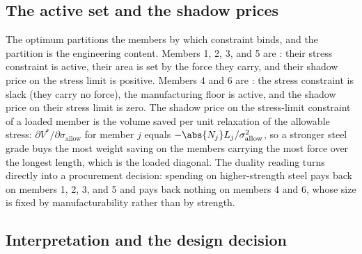 \subsection{The active set and the shadow prices}

The optimum partitions the members by which constraint binds, and
the partition is the engineering content. Members 1, 2, 3, and 5
are : their stress constraint is active,
their area is set by the force they carry, and their shadow price
on the stress limit is positive. Members 4 and 6 are
: the stress constraint is slack (they carry
no force), the manufacturing floor is active, and the shadow price
on their stress limit is zero. The shadow price on the
stress-limit constraint of a loaded member is the volume saved per
unit relaxation of the allowable stress: $\partial V^{*} /
\partial \sigma_{\mathrm{allow}}$ for member $j$ equals
$-\abs{N_{j}} L_{j} / \sigma_{\mathrm{allow}}^{2}$, so a stronger
steel grade buys the most weight saving on the members carrying the
most force over the longest length, which is the loaded diagonal.
The duality reading turns directly into a procurement decision:
spending on higher-strength steel pays back on members 1, 2, 3,
and 5 and pays back nothing on members 4 and 6, whose size is fixed
by manufacturability rather than by strength.

\subsection{Interpretation and the design decision}

